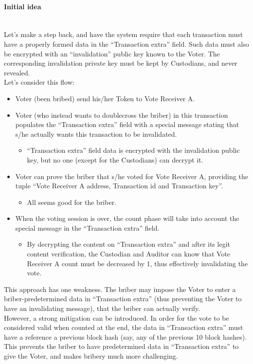 \documentclass[10pt, letterpaper]{article}
\newcommand{\subsubsubsection}[1]{\paragraph{#1}\mbox{}\\}
\begin{document}
\subsubsubsection{Initial idea}
Let’s make a step back, and have the system require that each transaction must have a properly formed data in the “Transaction extra” field. Such data must also be encrypted with an “invalidation” public key known to the Voter. The corresponding invalidation private key must be kept by Custodians, and never revealed. \\
Let’s consider this flow:
\begin{itemize}
\item Voter (been bribed) send his/her Token to Vote Receiver A.
\item Voter (who instead wants to doublecross the briber) in this transaction populates the “Transaction extra” field with a special message stating that s/he actually wants this transaction to be invalidated.
\begin{itemize}
\item “Transaction extra” field data is encrypted with the invalidation public key, but no one (except for the Custodians) can decrypt it. 
\end{itemize}
\item Voter can prove the briber that s/he voted for Vote Receiver A, providing the tuple “Vote Receiver A address, Transaction id and Transaction key”.
\begin{itemize}
\item All seems good for the briber.
\end{itemize}
\item When the voting session is over, the count phase will take into account the special message in the “Transaction extra” field.
\begin{itemize}
\item By decrypting the content on “Transaction extra” and after its legit content verification, the Custodian and Auditor can know that Vote Receiver A count must be decreased by 1, thus effectively invalidating the vote.
\end{itemize}
\end{itemize}
This approach has one weakness. The briber may impose the Voter to enter a briber-predetermined data in “Transaction extra” (thus preventing the Voter to have an invalidating message), that the briber can actually verify.\\
However, a strong mitigation can be introduced. In order for the vote to be considered valid when counted at the end, the data in “Transaction extra” must have a reference a previous block hash (say, any of the previous 10 block hashes). This prevents the briber to have predetermined data in “Transaction extra” to give the Voter, and makes bribery much more challenging.
\bigskip
\end{document}
